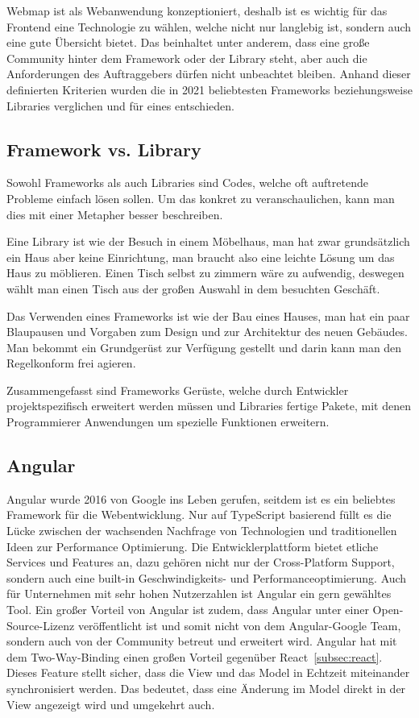 Webmap ist als Webanwendung konzeptioniert, deshalb ist es wichtig für das Frontend eine Technologie zu wählen, welche
nicht nur langlebig ist, sondern auch eine gute Übersicht bietet.
Das beinhaltet unter anderem, dass eine große Community hinter dem Framework oder der Library steht,
aber auch die Anforderungen des Auftraggebers dürfen nicht unbeachtet bleiben.
Anhand dieser definierten Kriterien wurden die in 2021 beliebtesten Frameworks beziehungsweise Libraries verglichen und für eines entschieden.

\subsection{Framework vs. Library}
\label{subsec:framework-versus-library}
Sowohl Frameworks als auch Libraries sind Codes, welche oft auftretende Probleme einfach lösen sollen.
Um das konkret zu veranschaulichen, kann man dies mit einer Metapher besser beschreiben.

Eine Library ist wie der Besuch in einem Möbelhaus, man hat zwar grundsätzlich ein Haus aber keine Einrichtung, man
braucht also eine leichte Lösung um das Haus zu möblieren.
Einen Tisch selbst zu zimmern wäre zu aufwendig, deswegen wählt man einen Tisch aus der großen Auswahl in dem besuchten Geschäft.

Das Verwenden eines Frameworks ist wie der Bau eines Hauses, man hat ein paar Blaupausen und Vorgaben zum Design und zur
Architektur des neuen Gebäudes.
Man bekommt ein Grundgerüst zur Verfügung gestellt und darin kann man den Regelkonform frei agieren.

Zusammengefasst sind Frameworks Gerüste, welche durch Entwickler projektspezifisch erweitert werden müssen und Libraries
fertige Pakete, mit denen Programmierer Anwendungen um spezielle Funktionen erweitern.

\subsection{Angular}
\label{subsec:angular}
Angular wurde 2016 von Google ins Leben gerufen, seitdem ist es ein beliebtes Framework für die Webentwicklung.
Nur auf TypeScript basierend füllt es die Lücke zwischen der wachsenden Nachfrage von Technologien und traditionellen
Ideen zur Performance Optimierung.
Die Entwicklerplattform bietet etliche Services und Features an, dazu gehören nicht nur der Cross-Platform Support,
sondern auch eine built-in Geschwindigkeits- und Performanceoptimierung.
Auch für Unternehmen mit sehr hohen Nutzerzahlen ist Angular ein gern gewähltes Tool.
Ein großer Vorteil von Angular ist zudem, dass Angular unter einer Open-Source-Lizenz veröffentlicht
ist und somit nicht von dem Angular-Google Team, sondern auch von der Community betreut und erweitert wird.
Angular hat mit dem Two-Way-Binding einen großen Vorteil gegenüber React~\ref{subsec:react}.
Dieses Feature stellt sicher, dass die View und das Model in Echtzeit miteinander synchronisiert werden.
Das bedeutet, dass eine Änderung im Model direkt in der View angezeigt wird und umgekehrt auch.
~\cite{angular-features,what-is-angular}

